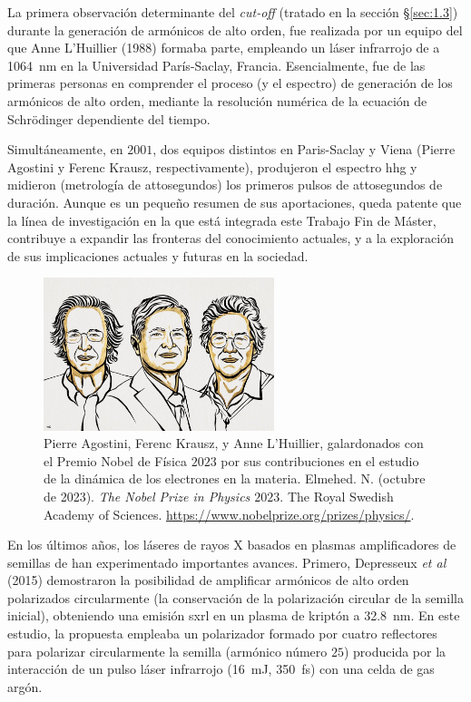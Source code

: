 La primera observación determinante del \emph{cut-off} (tratado en la sección \S\ref{sec:1.3}) durante la generación de armónicos de alto orden, fue realizada por un equipo del que Anne L'Huillier (1988)\autocite{Ferray1988} formaba parte, empleando un láser infrarrojo de  a \qty{1064}{nm} en la Universidad París-Saclay, Francia. Esencialmente, fue de las primeras personas en comprender el proceso (y el espectro) de generación de los armónicos de alto orden, mediante la resolución numérica de la ecuación de Schrödinger dependiente del tiempo.

Simultáneamente, en $2001$, dos equipos distintos en Paris-Saclay \autocite{Paul2001} y Viena \autocite{Drescher2001} (Pierre Agostini y Ferenc Krausz, respectivamente), produjeron el espectro \acrshort{hhg} y midieron (metrología de attosegundos) los primeros pulsos de attosegundos de duración. Aunque es un pequeño resumen de sus aportaciones, queda patente que la línea de investigación en la que está integrada este Trabajo Fin de Máster, contribuye a expandir las fronteras del conocimiento actuales, y a la exploración de sus implicaciones actuales y futuras en la sociedad.

\begin{figure}[htbp]
  \centering
  \includegraphics[width=0.6\textwidth]{Figuras/ch1_premionobel.png}
  \caption{Pierre Agostini, Ferenc Krausz, y Anne L'Huillier, galardonados con el Premio Nobel de Física $2023$ por sus contribuciones en el estudio de la dinámica de los electrones en la materia. Elmehed. N. (octubre de 2023). \emph{The Nobel Prize in Physics $2023$}. The Royal Swedish Academy of Sciences. \url{https://www.nobelprize.org/prizes/physics/}.}
  \label{fig:1.27}
\end{figure}

En los últimos años, los láseres de rayos X basados en plasmas amplificadores de semillas de  han experimentado importantes avances. Primero, Depresseux \emph{et al} (2015)\autocite{Depresseux2015a} demostraron la posibilidad de amplificar armónicos de alto orden polarizados circularmente (la conservación de la polarización circular de la semilla inicial), obteniendo una emisión \acrshort{sxrl} en un plasma de kriptón a \qty{32.8}{nm}. En este estudio, la propuesta empleaba un polarizador formado por cuatro reflectores para polarizar circularmente la semilla (armónico número $25$) producida por la interacción de un pulso láser infrarrojo (\qty{16}{mJ}, \qty{350}{fs}) con una celda de gas argón.

